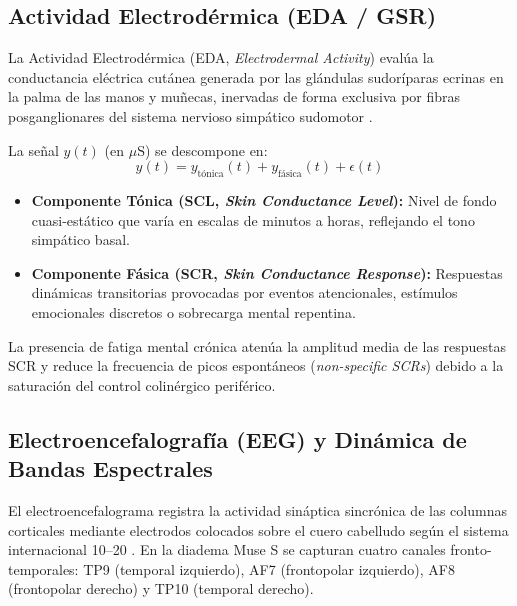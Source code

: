 \subsection{Actividad Electrodérmica (EDA / GSR)}

La Actividad Electrodérmica (EDA, \textit{Electrodermal Activity}) evalúa la conductancia eléctrica cutánea generada por las glándulas sudoríparas ecrinas en la palma de las manos y muñecas, inervadas de forma exclusiva por fibras posganglionares del sistema nervioso simpático sudomotor \cite{boucsein2012electrodermal}.

La señal $y(t)$ (en $\mu\text{S}$) se descompone en:
\begin{equation}
    y(t) = y_{\text{tónica}}(t) + y_{\text{fásica}}(t) + \epsilon(t)
\end{equation}
\begin{itemize}
    \item \textbf{Componente Tónica (SCL, \textit{Skin Conductance Level}):} Nivel de fondo cuasi-estático que varía en escalas de minutos a horas, reflejando el tono simpático basal.
    \item \textbf{Componente Fásica (SCR, \textit{Skin Conductance Response}):} Respuestas dinámicas transitorias provocadas por eventos atencionales, estímulos emocionales discretos o sobrecarga mental repentina.
\end{itemize}
La presencia de fatiga mental crónica atenúa la amplitud media de las respuestas SCR y reduce la frecuencia de picos espontáneos (\textit{non-specific SCRs}) debido a la saturación del control colinérgico periférico.

\subsection{Electroencefalografía (EEG) y Dinámica de Bandas Espectrales}

El electroencefalograma registra la actividad sináptica sincrónica de las columnas corticales mediante electrodos colocados sobre el cuero cabelludo según el sistema internacional 10--20 \cite{klimesch1999eeg}. En la diadema Muse S se capturan cuatro canales fronto-temporales: TP9 (temporal izquierdo), AF7 (frontopolar izquierdo), AF8 (frontopolar derecho) y TP10 (temporal derecho).

